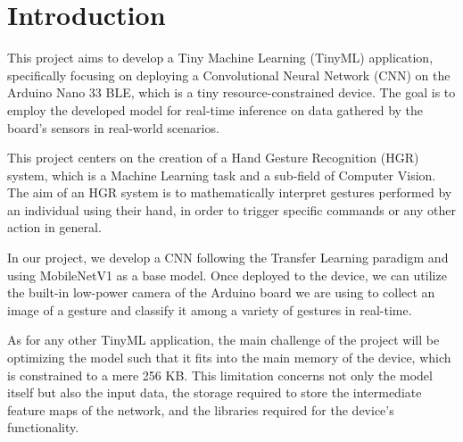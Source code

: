 \documentclass{Configuration_Files/PoliMi3i_thesis}
\begin{document}
\mainmatter %


\chapter*{Introduction}
\label{ch:introduction}%
This project aims to develop a Tiny Machine Learning (TinyML) application, specifically focusing on deploying a Convolutional Neural Network (CNN) on the Arduino Nano 33 BLE, which is a tiny resource-constrained device. The goal is to employ the developed model for real-time inference on data gathered by the board's sensors in real-world scenarios.

This project centers on the creation of a Hand Gesture Recognition (HGR) system, which is a Machine Learning task and a sub-field of Computer Vision. The aim of an HGR system is to mathematically interpret gestures performed by an individual using their hand, in order to trigger specific commands or any other action in general. 

In our project, we develop a CNN following the Transfer Learning paradigm and using MobileNetV1 as a base model. Once deployed to the device, we can utilize the built-in low-power camera of the Arduino board we are using to collect an image of a gesture and classify it among a variety of gestures in real-time. 

As for any other TinyML application, the main challenge of the project will be optimizing the model such that it fits into the main memory of the device, which is constrained to a mere 256 KB. This limitation concerns not only the model itself but also the input data, the storage required to store the intermediate feature maps of the network, and the libraries required for the device's functionality.
\end{document}
